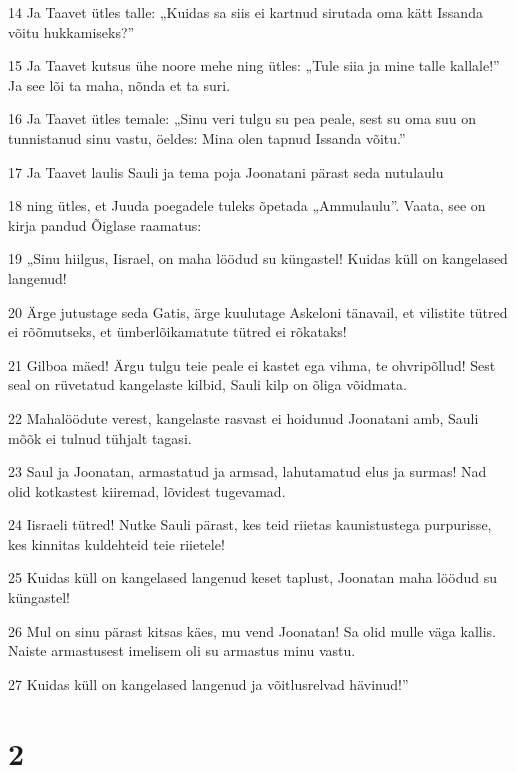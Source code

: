 \par 14 Ja Taavet ütles talle: „Kuidas sa siis ei kartnud sirutada oma kätt Issanda võitu hukkamiseks?”
\par 15 Ja Taavet kutsus ühe noore mehe ning ütles: „Tule siia ja mine talle kallale!” Ja see lõi ta maha, nõnda et ta suri.
\par 16 Ja Taavet ütles temale: „Sinu veri tulgu su pea peale, sest su oma suu on tunnistanud sinu vastu, öeldes: Mina olen tapnud Issanda võitu.”
\par 17 Ja Taavet laulis Sauli ja tema poja Joonatani pärast seda nutulaulu
\par 18 ning ütles, et Juuda poegadele tuleks õpetada „Ammulaulu”. Vaata, see on kirja pandud Õiglase raamatus:
\par 19 „Sinu hiilgus, Iisrael, on maha löödud su küngastel! Kuidas küll on kangelased langenud!
\par 20 Ärge jutustage seda Gatis, ärge kuulutage Askeloni tänavail, et vilistite tütred ei rõõmutseks, et ümberlõikamatute tütred ei rõkataks!
\par 21 Gilboa mäed! Ärgu tulgu teie peale ei kastet ega vihma, te ohvripõllud! Sest seal on rüvetatud kangelaste kilbid, Sauli kilp on õliga võidmata.
\par 22 Mahalöödute verest, kangelaste rasvast ei hoidunud Joonatani amb, Sauli mõõk ei tulnud tühjalt tagasi.
\par 23 Saul ja Joonatan, armastatud ja armsad, lahutamatud elus ja surmas! Nad olid kotkastest kiiremad, lõvidest tugevamad.
\par 24 Iisraeli tütred! Nutke Sauli pärast, kes teid riietas kaunistustega purpurisse, kes kinnitas kuldehteid teie riietele!
\par 25 Kuidas küll on kangelased langenud keset taplust, Joonatan maha löödud su küngastel!
\par 26 Mul on sinu pärast kitsas käes, mu vend Joonatan! Sa olid mulle väga kallis. Naiste armastusest imelisem oli su armastus minu vastu.
\par 27 Kuidas küll on kangelased langenud ja võitlusrelvad hävinud!”

\chapter{2}

